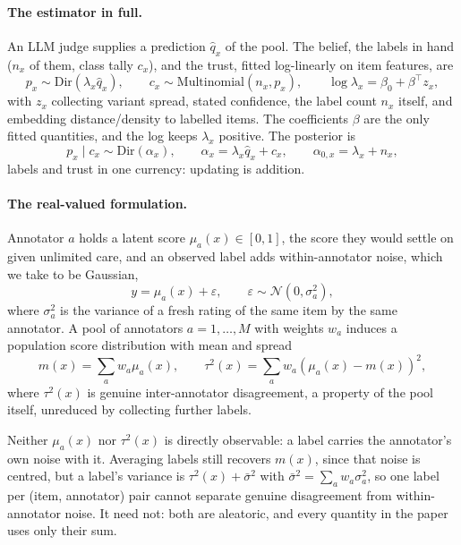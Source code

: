 \documentclass{article}
\begin{document}
\paragraph{The estimator in full.}
An LLM judge supplies a prediction $\hat q_x$ of the pool. The belief, the labels
in hand ($n_x$ of them, class tally $c_x$), and the trust, fitted log-linearly on
item features, are
\begin{equation*}
  p_x \sim \mathrm{Dir}(\lambda_x \hat q_x), \qquad
  c_x \sim \mathrm{Multinomial}(n_x, p_x), \qquad
  \log \lambda_x = \beta_0 + \beta^\top z_x,
\end{equation*}
with $z_x$ collecting variant spread, stated confidence, the label count $n_x$
itself, and embedding distance/density to labelled items. The coefficients $\beta$
are the only fitted quantities, and the log keeps $\lambda_x$ positive. The posterior
is
\begin{equation*}
  p_x \mid c_x \sim \mathrm{Dir}(\alpha_x), \qquad
  \alpha_x = \lambda_x \hat q_x + c_x, \qquad
  \alpha_{0,x} = \lambda_x + n_x,
\end{equation*}
labels and trust in one currency: updating is addition.

\paragraph{The real-valued formulation.}
Annotator $a$ holds a latent score $\mu_a(x) \in [0,1]$, the score they would settle on
given unlimited care, and an observed label adds within-annotator noise, which we take to
be Gaussian,
\begin{equation*}
  y = \mu_a(x) + \varepsilon, \qquad \varepsilon \sim \mathcal{N}(0, \sigma_a^2),
\end{equation*}
where $\sigma_a^2$ is the variance of a fresh rating of the same item by the same annotator.
A pool of annotators $a = 1, \dots, M$ with weights $w_a$ induces a population score
distribution with mean and spread
\begin{equation*}
  m(x) = \sum_a w_a \mu_a(x), \qquad
  \tau^2(x) = \sum_a w_a (\mu_a(x) - m(x))^2,
\end{equation*}
where $\tau^2(x)$ is genuine inter-annotator disagreement, a property of the pool itself,
unreduced by collecting further labels.

Neither $\mu_a(x)$ nor $\tau^2(x)$ is directly observable: a label carries the annotator's
own noise with it. Averaging labels still recovers $m(x)$, since that noise is centred, but a
label's variance is $\tau^2(x) + \bar\sigma^2$ with $\bar\sigma^2 = \sum_a w_a \sigma_a^2$, so
one label per (item, annotator) pair cannot separate genuine disagreement from
within-annotator noise. It need not: both are aleatoric, and every quantity in the paper uses
only their sum.
\end{document}
